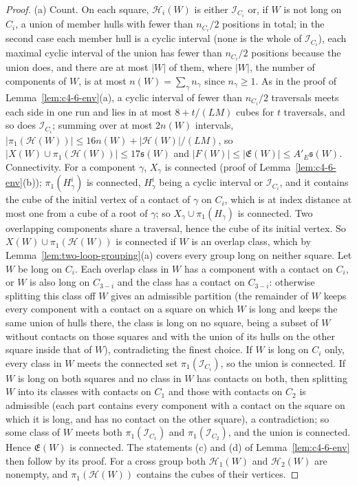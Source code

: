 \begin{proof}
(a) Count. On each square, $\mathcal H_i(W)$ is either $\mathcal I_{C_i}$ or, if $W$ is not long on $C_i$, a union of member hulls with fewer than $n_{C_i}/2$ positions in total; in the second case each member hull is a cyclic interval (none is the whole of $\mathcal I_{C_i}$), each maximal cyclic interval of the union has fewer than $n_{C_i}/2$ positions because the union does, and there are at most $|W|$ of them, where $|W|$, the number of components of $W$, is at most $n(W)=\sum_\gamma n_\gamma$ since $n_\gamma\geq1$. As in the proof of Lemma~\ref{lem:c4-6-env}(a), a cyclic interval of fewer than $n_{C_i}/2$ traversals meets each side in one run and lies in at most $8+t/(LM)$ cubes for $t$ traversals, and so does $\mathcal I_{C_i}$; summing over at most $2n(W)$ intervals, $|\pi_1(\mathcal H(W))|\leq16n(W)+|\mathcal H(W)|/(LM)$, so $|X(W)\cup\pi_1(\mathcal H(W))|\leq17\mathfrak s(W)$ and $|F(W)|\leq|\mathfrak E(W)|\leq A'_E\mathfrak s(W)$. Connectivity. For a component $\gamma$, $X_\gamma$ is connected (proof of Lemma~\ref{lem:c4-6-env}(b)); $\pi_1(H^i_\gamma)$ is connected, $H^i_\gamma$ being a cyclic interval or $\mathcal I_{C_i}$, and it contains the cube of the initial vertex of a contact of $\gamma$ on $C_i$, which is at index distance at most one from a cube of a root of $\gamma$; so $X_\gamma\cup\pi_1(H_\gamma)$ is connected. Two overlapping components share a traversal, hence the cube of its initial vertex. So $X(W)\cup\pi_1(\mathcal H(W))$ is connected if $W$ is an overlap class, which by Lemma~\ref{lem:two-loop-grouping}(a) covers every group long on neither square. Let $W$ be long on $C_i$. Each overlap class in $W$ has a component with a contact on $C_i$, or $W$ is also long on $C_{3-i}$ and the class has a contact on $C_{3-i}$: otherwise splitting this class off $W$ gives an admissible partition (the remainder of $W$ keeps every component with a contact on a square on which $W$ is long and keeps the same union of hulls there, the class is long on no square, being a subset of $W$ without contacts on those squares and with the union of its hulls on the other square inside that of $W$), contradicting the finest choice. If $W$ is long on $C_i$ only, every class in $W$ meets the connected set $\pi_1(\mathcal I_{C_i})$, so the union is connected. If $W$ is long on both squares and no class in $W$ has contacts on both, then splitting $W$ into its classes with contacts on $C_1$ and those with contacts on $C_2$ is admissible (each part contains every component with a contact on the square on which it is long, and has no contact on the other square), a contradiction; so some class of $W$ meets both $\pi_1(\mathcal I_{C_1})$ and $\pi_1(\mathcal I_{C_2})$, and the union is connected. Hence $\mathfrak E(W)$ is connected. The statements (c) and (d) of Lemma~\ref{lem:c4-6-env} then follow by its proof. For a cross group both $\mathcal H_1(W)$ and $\mathcal H_2(W)$ are nonempty, and $\pi_1(\mathcal H(W))$ contains the cubes of their vertices.


\end{proof}
